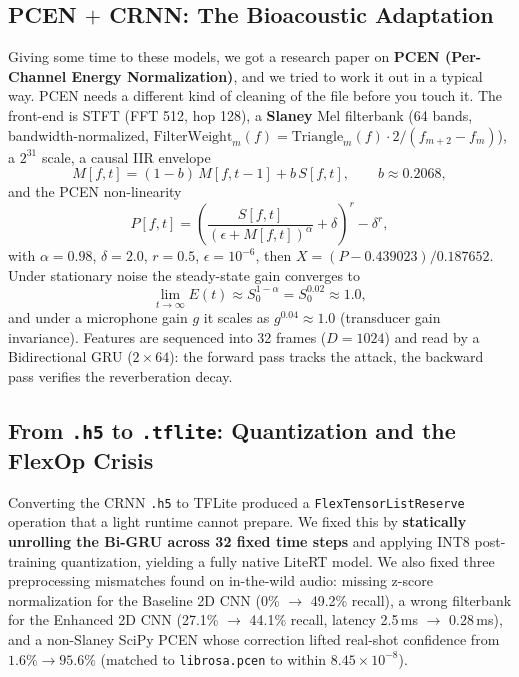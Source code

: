 \documentclass[conference]{IEEEtran}
\begin{document}
\subsection{PCEN $+$ CRNN: The Bioacoustic Adaptation}
Giving some time to these models, we got a research paper on \textbf{PCEN (Per-Channel Energy
Normalization)}, and we tried to work it out in a typical way. PCEN needs a different kind of cleaning of the
file before you touch it. The front-end is STFT (FFT 512, hop 128), a \textbf{Slaney} Mel filterbank (64
bands, bandwidth-normalized, $\text{FilterWeight}_m(f) = \text{Triangle}_m(f)\cdot 2/(f_{m+2}-f_m)$), a
$2^{31}$ scale, a causal IIR envelope
\begin{equation}
    M[f,t] = (1-b)\,M[f,t-1] + b\,S[f,t], \qquad b \approx 0.2068,
\end{equation}
and the PCEN non-linearity
\begin{equation}
    P[f,t] = \left(\frac{S[f,t]}{(\epsilon + M[f,t])^{\alpha}} + \delta\right)^{r} - \delta^{r},
\end{equation}
with $\alpha = 0.98$, $\delta = 2.0$, $r = 0.5$, $\epsilon = 10^{-6}$, then
$X = (P - 0.439023)/0.187652$. Under stationary noise the steady-state gain converges to
\begin{equation}
    \lim_{t\to\infty} E(t) \approx S_0^{1-\alpha} = S_0^{0.02} \approx 1.0,
\end{equation}
and under a microphone gain $g$ it scales as $g^{0.04} \approx 1.0$ (transducer gain invariance). Features
are sequenced into 32 frames ($D=1024$) and read by a Bidirectional GRU ($2\times64$): the forward pass
tracks the attack, the backward pass verifies the reverberation decay.

\subsection{From \texttt{.h5} to \texttt{.tflite}: Quantization and the FlexOp Crisis}
Converting the CRNN \texttt{.h5} to TFLite produced a \texttt{FlexTensorListReserve} operation that a light
runtime cannot prepare. We fixed this by \textbf{statically unrolling the Bi-GRU across 32 fixed time steps}
and applying INT8 post-training quantization, yielding a fully native LiteRT model. We also fixed three
preprocessing mismatches found on in-the-wild audio: missing z-score normalization for the Baseline 2D CNN
(0\% $\to$ 49.2\% recall), a wrong filterbank for the Enhanced 2D CNN (27.1\% $\to$ 44.1\% recall, latency
2.5\,ms $\to$ 0.28\,ms), and a non-Slaney SciPy PCEN whose correction lifted real-shot confidence from
$1.6\% \to 95.6\%$ (matched to \texttt{librosa.pcen} to within $8.45\times10^{-8}$).
\end{document}
